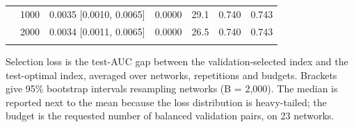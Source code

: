 \begin{table}[htbp]
\begin{tabular}{l r l r r r r}
 & 1000 & 0.0035 [0.0010, 0.0065] & 0.0000 & 29.1 & 0.740 & 0.743 \\
 & 2000 & 0.0034 [0.0011, 0.0065] & 0.0000 & 26.5 & 0.740 & 0.743 \\
\addlinespace[2pt]
\bottomrule
\end{tabular}
\par\vspace{2pt}\begin{minipage}{\linewidth}\footnotesize Selection loss is the test-AUC gap between the validation-selected index and the test-optimal index, averaged over networks, repetitions and budgets. Brackets give 95\% bootstrap intervals resampling networks (B = 2{,}000). The median is reported next to the mean because the loss distribution is heavy-tailed; the budget is the requested number of balanced validation pairs, on 23 networks.\end{minipage}
\end{table}
